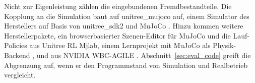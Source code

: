 Nicht zur Eigenleistung zählen die eingebundenen Fremdbestandteile.
Die Kopplung an die Simulation baut auf unitree\_mujoco auf, einem Simulator des Herstellers auf Basis von unitree\_sdk2 und MuJoCo \cite{UnitreeMujoco}.
Hinzu kommen weitere Herstellerpakete, ein browserbasierter Szenen-Editor für MuJoCo und die Lauf-Policies aus Unitree RL Mjlab, einem Lernprojekt mit MuJoCo als Physik-Backend \cite{UnitreeRLMjlab}, und aus NVIDIA WBC-AGILE .
Abschnitt~\ref{sec:eval_code} greift die Abgrenzung auf, wenn er den Programmstand von Simulation und Realbetrieb vergleicht.
